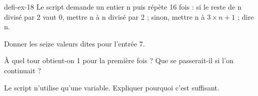 \begin{blocEdition}{defi-ex-18}
Le script demande un entier n puis répète 16 fois : si le reste de n divisé par 2 vaut 0, mettre n à n divisé par 2 ; sinon, mettre n à $3\times n+1$ ; dire n.\begin{questions}\item Donner les seize valeurs dites pour l’entrée 7.\item À quel tour obtient-on 1 pour la première fois ? Que se passerait-il si l’on continuait ?\item Le script n’utilise qu’une variable. Expliquer pourquoi c’est suffisant.\end{questions}\label{fig-defi-18}
\par{}\par\par{}\par{}\par{}\par{}\par{}\par{}
\end{blocEdition}
